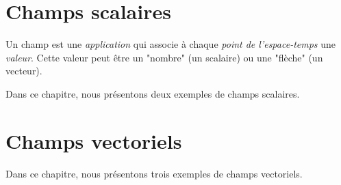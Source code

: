 \chapter{Champs scalaires}
%
Un champ est une {\it application} qui associe à chaque {\it point de l'espace-temps} une {\it valeur}. Cette valeur peut être un "nombre" (un scalaire) ou une "flèche" (un vecteur).

Dans ce chapitre, nous présentons deux exemples de champs scalaires.


%

%
\chapter{Champs vectoriels}
%

Dans ce chapitre, nous présentons trois exemples de champs vectoriels.


%

%

%

